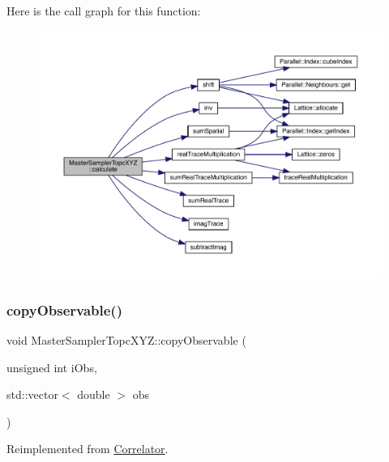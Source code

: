 Here is the call graph for this function\+:\nopagebreak
\begin{figure}[H]
\begin{center}
\leavevmode
\includegraphics[width=350pt]{class_master_sampler_topc_x_y_z_a0ea80ad9935db791f00461b7dfd548b7_cgraph}
\end{center}
\end{figure}
\mbox{\label{class_master_sampler_topc_x_y_z_a49ef8ccce4bf9473017bbb7c01f1404b}} 
\subsubsection{\texorpdfstring{copyObservable()}{copyObservable()}}
{\footnotesize\ttfamily void Master\+Sampler\+Topc\+X\+Y\+Z\+::copy\+Observable (\begin{DoxyParamCaption}\item[{unsigned int}]{i\+Obs,  }\item[{std\+::vector$<$ double $>$}]{obs }\end{DoxyParamCaption})\hspace{0.3cm}{\ttfamily [virtual]}}



Reimplemented from \mbox{\hyperlink{class_correlator_ac780d8b180294ee4801ede6e6a13f7f4}{Correlator}}.

\mbox{\label{class_master_sampler_topc_x_y_z_a1a922db23320ff46f8f736788c6977bb}} 
